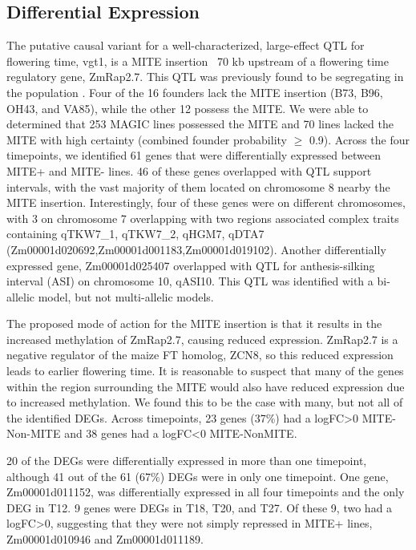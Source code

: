 \documentclass[article,9pt,twocolumn,twoside]{rilabRxiv}
\begin{document}


\subsection{Differential Expression}
The putative causal variant for a well-characterized, large-effect QTL for flowering time, vgt1, is a MITE insertion ~70 kb upstream of a flowering time regulatory gene, ZmRap2.7.
This QTL was previously found to be segregating in the population \citep{Odell}.
Four of the 16 founders lack the MITE insertion (B73, B96, OH43, and VA85), while the other 12 possess the MITE.
We were able to determined that 253 MAGIC lines possessed the MITE and 70 lines lacked the MITE with high certainty (combined founder probability $\ge$ 0.9).
Across the four timepoints, we identified 61 genes that were differentially expressed between MITE+ and MITE- lines.
46 of these genes overlapped with QTL support intervals, with the vast majority of them located on chromosome 8 nearby the MITE insertion.
Interestingly,  four of these genes were on different chromosomes, with 3 on chromosome 7 overlapping with two regions associated complex traits containing qTKW7\_1, qTKW7\_2, qHGM7, qDTA7 (Zm00001d020692,Zm00001d001183,Zm00001d019102).
Another differentially expressed gene, Zm00001d025407 overlapped with QTL for anthesis-silking interval (ASI) on chromosome 10, qASI10.
This QTL was identified with a bi-allelic model, but not multi-allelic models.

The proposed mode of action for the MITE insertion is that it results in the increased methylation of ZmRap2.7, causing reduced expression.
ZmRap2.7 is a negative regulator of the maize FT homolog, ZCN8, so this reduced expression leads to earlier flowering time. 
It is reasonable to suspect that many of the genes within the region surrounding the MITE would also have reduced expression due to increased methylation.
We found this to be the case with many, but not all of the identified DEGs.
Across timepoints, 23 genes (37\%) had a logFC>0 MITE-Non-MITE and 38 genes had a logFC<0 MITE-NonMITE.

20 of the DEGs were differentially expressed in more than one timepoint, although 41 out of the 61 (67\%) DEGs were in only one timepoint.
One gene, Zm00001d011152, was differentially expressed in all four timepoints and the only DEG in T12.
9 genes were DEGs in T18, T20, and T27.
Of these 9, two had a logFC>0, suggesting that they were not simply repressed in MITE+ lines, Zm00001d010946 and Zm00001d011189. 
\end{document}
